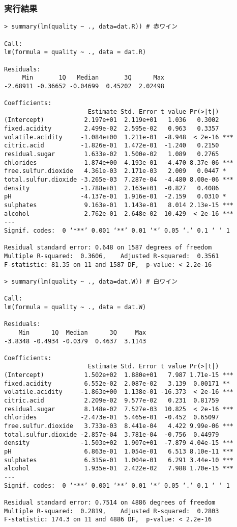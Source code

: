 \documentclass{jsarticle}
\begin{document}
\subsubsection*{実行結果}
\begin{verbatim}
> summary(lm(quality ~ ., data=dat.R)) # 赤ワイン

Call:
lm(formula = quality ~ ., data = dat.R)

Residuals:
     Min       1Q   Median       3Q      Max 
-2.68911 -0.36652 -0.04699  0.45202  2.02498 

Coefficients:
                       Estimate Std. Error t value Pr(>|t|)    
(Intercept)           2.197e+01  2.119e+01   1.036   0.3002    
fixed.acidity         2.499e-02  2.595e-02   0.963   0.3357    
volatile.acidity     -1.084e+00  1.211e-01  -8.948  < 2e-16 ***
citric.acid          -1.826e-01  1.472e-01  -1.240   0.2150    
residual.sugar        1.633e-02  1.500e-02   1.089   0.2765    
chlorides            -1.874e+00  4.193e-01  -4.470 8.37e-06 ***
free.sulfur.dioxide   4.361e-03  2.171e-03   2.009   0.0447 *  
total.sulfur.dioxide -3.265e-03  7.287e-04  -4.480 8.00e-06 ***
density              -1.788e+01  2.163e+01  -0.827   0.4086    
pH                   -4.137e-01  1.916e-01  -2.159   0.0310 *  
sulphates             9.163e-01  1.143e-01   8.014 2.13e-15 ***
alcohol               2.762e-01  2.648e-02  10.429  < 2e-16 ***
---
Signif. codes:  0 ‘***’ 0.001 ‘**’ 0.01 ‘*’ 0.05 ‘.’ 0.1 ‘ ’ 1

Residual standard error: 0.648 on 1587 degrees of freedom
Multiple R-squared:  0.3606,    Adjusted R-squared:  0.3561 
F-statistic: 81.35 on 11 and 1587 DF,  p-value: < 2.2e-16

> summary(lm(quality ~ ., data=dat.W)) # 白ワイン

Call:
lm(formula = quality ~ ., data = dat.W)

Residuals:
    Min      1Q  Median      3Q     Max 
-3.8348 -0.4934 -0.0379  0.4637  3.1143 

Coefficients:
                       Estimate Std. Error t value Pr(>|t|)    
(Intercept)           1.502e+02  1.880e+01   7.987 1.71e-15 ***
fixed.acidity         6.552e-02  2.087e-02   3.139  0.00171 ** 
volatile.acidity     -1.863e+00  1.138e-01 -16.373  < 2e-16 ***
citric.acid           2.209e-02  9.577e-02   0.231  0.81759    
residual.sugar        8.148e-02  7.527e-03  10.825  < 2e-16 ***
chlorides            -2.473e-01  5.465e-01  -0.452  0.65097    
free.sulfur.dioxide   3.733e-03  8.441e-04   4.422 9.99e-06 ***
total.sulfur.dioxide -2.857e-04  3.781e-04  -0.756  0.44979    
density              -1.503e+02  1.907e+01  -7.879 4.04e-15 ***
pH                    6.863e-01  1.054e-01   6.513 8.10e-11 ***
sulphates             6.315e-01  1.004e-01   6.291 3.44e-10 ***
alcohol               1.935e-01  2.422e-02   7.988 1.70e-15 ***
---
Signif. codes:  0 ‘***’ 0.001 ‘**’ 0.01 ‘*’ 0.05 ‘.’ 0.1 ‘ ’ 1

Residual standard error: 0.7514 on 4886 degrees of freedom
Multiple R-squared:  0.2819,    Adjusted R-squared:  0.2803 
F-statistic: 174.3 on 11 and 4886 DF,  p-value: < 2.2e-16
\end{verbatim}
\end{document}
